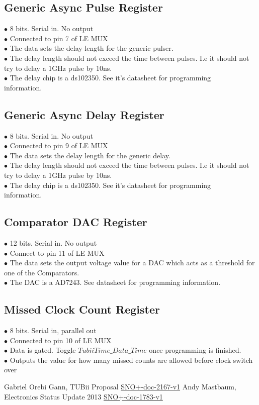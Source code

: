 \documentclass[11pt,a4paper]{article}
\begin{document}
\subsection{Generic Async Pulse Register}
$\bullet$ 8 bits. Serial in. No output\\
$\bullet$ Connected to pin 7 of LE MUX \\
$\bullet$ The data sets the delay length for the generic pulser. \\
$\bullet$ The delay length should not exceed the time between pulses. I.e it should not try to delay a 1GHz pulse by 10ns.\\
$\bullet$ The delay chip is a ds102350. See it's datasheet for programming\\ information.\\
\subsection{Generic Async Delay Register}
$\bullet$ 8 bits. Serial in. No output \\
$\bullet$ Connected to pin 9 of LE MUX \\
$\bullet$ The data sets the delay length for the generic delay. \\
$\bullet$ The delay length should not exceed the time between pulses. I.e it should not try to delay a 1GHz pulse by 10ns.\\
$\bullet$ The delay chip is a ds102350. See it's datasheet for programming\\ information.\\
\subsection{Comparator DAC Register}
$\bullet$ 12 bits. Serial in. No output \\
$\bullet$ Connect to pin 11 of LE MUX \\
$\bullet$ The data sets the output voltage value for a DAC which acts as a threshold for one of the Comparators. \\
$\bullet$ The DAC is a AD7243. See datasheet for programming information.\\
\subsection{Missed Clock Count Register}
$\bullet$ 8 bits. Serial in, parallel out \\
$\bullet$ Connected to pin 10 of LE MUX \\
$\bullet$ Data is gated. Toggle $TubiiTime\_Data\_Time$ once programming is finished.\\
$\bullet$ Outputs the value for how many missed counts are allowed before clock switch over \\

\begin{thebibliography}{9}
Gabriel Orebi Gann, TUBii Proposal \href{https://www.snolab.ca/snoplus/private/DocDB/cgi/ShowDocument?docid=2167}{SNO+-doc-2167-v1}
Andy Mastbaum, Electronics Status Update 2013 \href{https://www.snolab.ca/snoplus/private/DocDB/0017/001783/001/electronics.pdf}{SNO+-doc-1783-v1}
\end{thebibliography}
\end{document}

